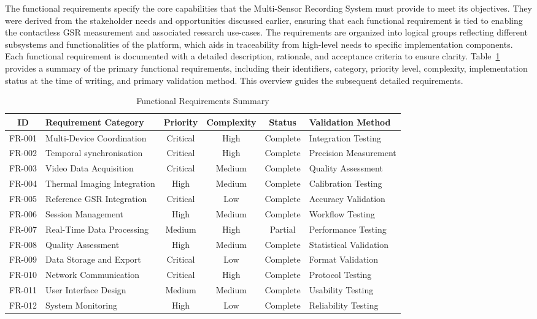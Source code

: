 \documentclass[11pt,a4paper]{report}
\begin{document}
The functional requirements specify the core capabilities that the Multi-Sensor Recording System must provide to meet its objectives. They were derived from the stakeholder needs and opportunities discussed earlier, ensuring that each functional requirement is tied to enabling the contactless GSR measurement and associated research use-cases. The requirements are organized into logical groups reflecting different subsystems and functionalities of the platform, which aids in traceability from high-level needs to specific implementation components. Each functional requirement is documented with a detailed description, rationale, and acceptance criteria to ensure clarity. Table~\ref{tab:fr_summary} provides a summary of the primary functional requirements, including their identifiers, category, priority level, complexity, implementation status at the time of writing, and primary validation method. This overview guides the subsequent detailed requirements. \begin{table}[h]
\centering
\caption{Functional Requirements Summary}
\label{tab:fr_summary}
\begin{tabular}{c p{3.5cm} c c c p{3.5cm}}
\toprule
\textbf{ID} & \textbf{Requirement Category} & \textbf{Priority} & \textbf{Complexity} & \textbf{Status} & \textbf{Validation Method} \\
\midrule
FR-001 & Multi-Device Coordination & Critical & High & Complete & Integration Testing \\
FR-002 & Temporal synchronisation & Critical & High & Complete & Precision Measurement \\
FR-003 & Video Data Acquisition & Critical & Medium & Complete & Quality Assessment \\
FR-004 & Thermal Imaging Integration & High & Medium & Complete & Calibration Testing \\
FR-005 & Reference GSR Integration & Critical & Low & Complete & Accuracy Validation \\
FR-006 & Session Management & High & Medium & Complete & Workflow Testing \\
FR-007 & Real-Time Data Processing & Medium & High & Partial & Performance Testing \\
FR-008 & Quality Assessment & High & Medium & Complete & Statistical Validation \\
FR-009 & Data Storage and Export & Critical & Low & Complete & Format Validation \\
FR-010 & Network Communication & Critical & High & Complete & Protocol Testing \\
FR-011 & User Interface Design & Medium & Medium & Complete & Usability Testing \\
FR-012 & System Monitoring & High & Low & Complete & Reliability Testing \\
\bottomrule
\end{tabular}
\end{table} %
\end{document}
